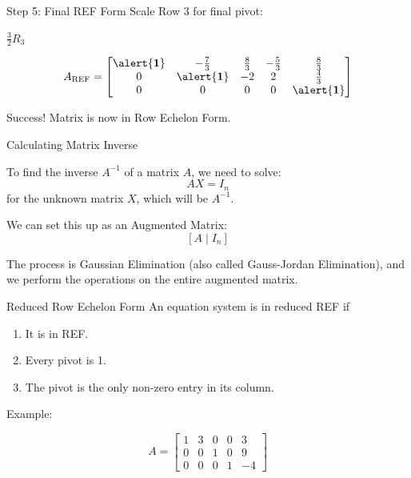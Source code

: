 \documentclass[aspectratio=169,xcolor=dvipsnames,svgnames,x11names,fleqn]{beamer}
\begin{document}
\begin{frame}{Step 5: Final REF Form}
\centering
Scale Row 3 for final pivot:

\vspace{3mm}
$\frac{3}{2}R_3$

\vspace{3mm}
$$
A_{\text{REF}} = \begin{bmatrix}
\alert{\mathbf{1}} & -\frac{7}{3} & \frac{8}{3} & -\frac{5}{3} & \frac{8}{3} \\
0 & \alert{\mathbf{1}} & -2 & 2 & \frac{4}{3} \\
0 & 0 & 0 & 0 & \alert{\mathbf{1}} \\
\end{bmatrix}
$$

\vspace{3mm}
\alert{Success!} Matrix is now in Row Echelon Form.
\end{frame}


\begin{frame}{Calculating Matrix Inverse}

    
To find the inverse $A^{-1}$ of a matrix $A$, we need to solve:
$$
A X = I_n
$$
for the unknown matrix $X$, which will be $A^{-1}$.

\vspace{5mm}
We can set this up as an \alert{Augmented Matrix}:
$$
\left[A \mid I_n \right]
$$

\vspace{3mm}

\vspace{3mm}
The process is Gaussian Elimination (also called Gauss-Jordan Elimination), and we perform the operations on the entire augmented matrix.
\end{frame}

\begin{frame}{Reduced Row Echelon Form}
An equation system is in reduced REF if
    \begin{enumerate}
        \item It is in REF.
        \item Every pivot is 1.
        \item The pivot is the only non-zero entry in its column.
    \end{enumerate}

    \alert{Example:}

    \centering
    $$
    A = \begin{bmatrix}
        1 & 3 & 0 & 0 & 3\\
        0 & 0 & 1 & 0 & 9\\
        0 & 0 & 0 & 1 & -4
    \end{bmatrix}
    $$
    
\end{frame}
\end{document}
